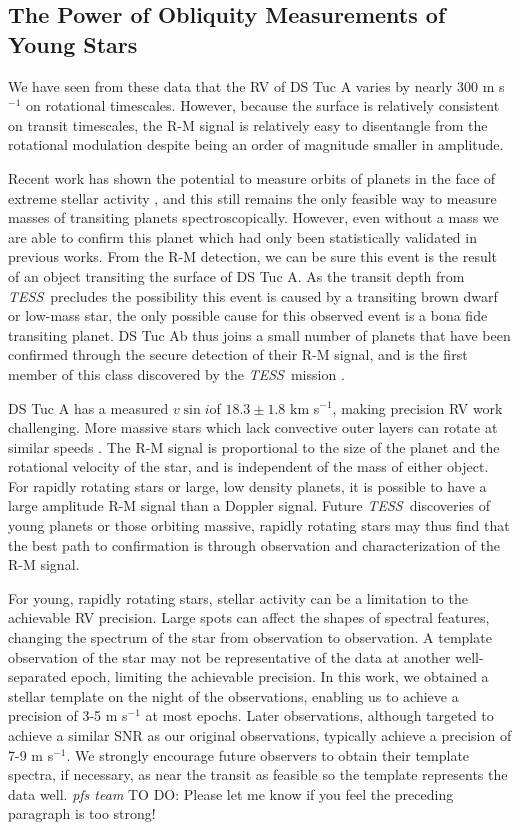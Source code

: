 \documentclass[twocolumn]{aastex63}
\newcommand{\tess}{{\it TESS}}
\newcommand{\vsini}{{$v \sin i$}}
\newcommand{\todo}[3]{{\color{#2} \emph{#1} TO DO: #3}}
\begin{document}
\subsection{The Power of Obliquity Measurements of Young Stars}

We have seen from these data that the RV of DS Tuc A varies by nearly 300 m s$^{-1}$ on rotational timescales. 
However, because the surface is relatively consistent on transit timescales, the R-M signal is relatively easy to disentangle from the rotational modulation despite being an order of magnitude smaller in amplitude.

Recent work has shown the potential to measure orbits of planets in the face of extreme stellar activity \citep{Barragan19}, and this still remains the only feasible way to measure masses of transiting planets spectroscopically. 
However, even without a mass we are able to confirm this planet which had only been statistically validated in previous works. 
From the R-M detection, we can be sure this event is the result of an object transiting the surface of DS Tuc A. 
As the transit depth from \tess\ precludes the possibility this event is caused by a transiting brown dwarf or low-mass star, the only possible cause for this observed event is a bona fide transiting planet.
DS Tuc Ab thus joins a small number of planets that have been confirmed through the secure detection of their R-M signal, and is the first member of this class discovered by the \tess\ mission \citep{Jenkins10b, Hirano12b}. 

DS Tuc A has a measured \vsini of $18.3 \pm 1.8$ km s$^{-1}$, making precision RV work challenging.
More massive stars which lack convective outer layers can rotate at similar speeds \citep[e.g.][]{McQuillan14}. 
The R-M signal is proportional to the size of the planet and the rotational velocity of the star, and is independent of the mass of either object. 
For rapidly rotating stars or large, low density planets, it is possible to have a large amplitude R-M signal than a Doppler signal. 
Future \tess\ discoveries of young planets or those orbiting massive, rapidly rotating stars may thus find that the best path to confirmation is through observation and characterization of the R-M signal.

For young, rapidly rotating stars, stellar activity can be a limitation to the achievable RV precision.
Large spots can affect the shapes of spectral features, changing the spectrum of the star from observation to observation. 
A template observation of the star may not be representative of the data at another well-separated epoch, limiting the achievable precision.
In this work, we obtained a stellar template on the night of the observations, enabling us to achieve a precision of 3-5 m s$^{-1}$ at most epochs. 
Later observations, although targeted to achieve a similar SNR as our original observations, typically achieve a precision of 7-9 m s$^{-1}$. 
We strongly encourage future observers to obtain their template spectra, if necessary, as near the transit as feasible so the template represents the data well.
\todo{pfs team}{red}{Please let me know if you feel the preceding paragraph is too strong!}
\end{document}

